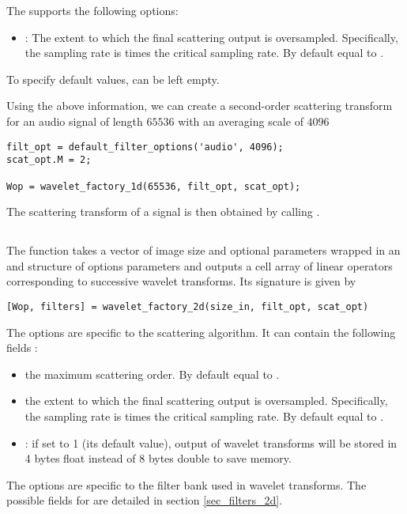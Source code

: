 \documentclass[twocolumn]{article}
\begin{document}
The  supports the following options:
\begin{itemize}
	\item {}: The extent to which the final scattering output is oversampled. Specifically, the sampling rate is  times the critical sampling rate. By default equal to .
\end{itemize}
To specify default values,  can be left empty.

Using the above information, we can create a second-order scattering transform for an audio signal of length $65536$ with an averaging scale of $4096$
\begin{lstlisting}
filt_opt = default_filter_options('audio', 4096);
scat_opt.M = 2;

Wop = wavelet_factory_1d(65536, filt_opt, scat_opt);
\end{lstlisting}
The scattering transform of a signal  is then obtained by calling .

\subsection{}
The  function takes a  vector of image size and optional parameters wrapped in an  and  structure of options parameters and outputs a cell array of linear operators corresponding to successive wavelet transforms. Its signature  is given by
\begin{lstlisting}
[Wop, filters] = wavelet_factory_2d(size_in, filt_opt, scat_opt)
\end{lstlisting}
The  options are specific to the scattering algorithm. It can contain the following fields :
\begin{itemize}
	\item {} the maximum scattering order. By default equal to .
	\item {} the extent to which the final scattering output is oversampled. Specifically, the sampling rate is  times the critical sampling rate. By default equal to .
	\item {}: if set to 1 (its default value), output of wavelet transforms will be stored in 4 bytes float instead of 8 bytes double to save memory.
\end{itemize}
The  options are specific to the filter bank used in wavelet transforms. The possible fields for  are detailed in section \ref{sec_filters_2d}.
\end{document}

